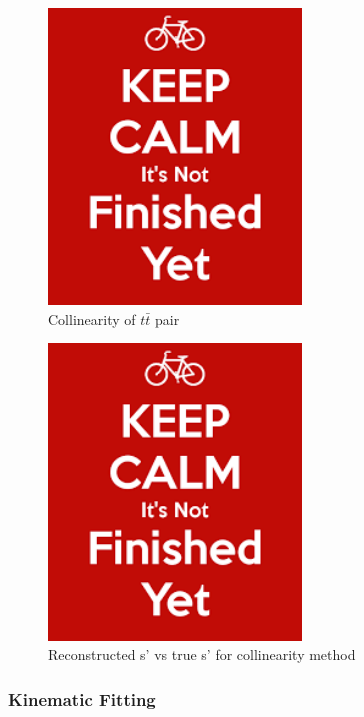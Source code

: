 \begin{figure}
  \centering
  \includegraphics[width=0.6\textwidth]{figures/dummy}
  \caption[Collinearity of $t\bar{t}$ pair]{Collinearity of $t\bar{t}$ pair}
  \label{fig:Collinearity}
\end{figure}

\begin{figure}
  \centering
  \includegraphics[width=0.6\textwidth]{figures/dummy}
  \caption[Reconstructed s' vs true s' for collinearity method]{Reconstructed s' vs true s' for collinearity method}
  \label{fig:CollinearitySPrime}
\end{figure}

\subsubsection{Kinematic Fitting}







